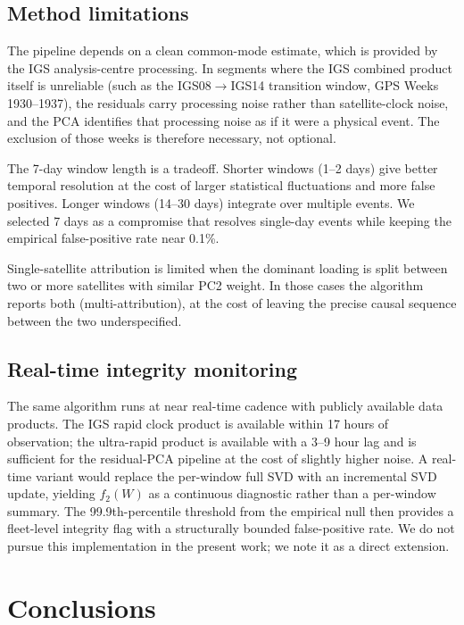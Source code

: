 \documentclass[11pt,a4paper]{article}
\begin{document}
\subsection{Method limitations}

The pipeline depends on a clean common-mode estimate, which is provided by the IGS analysis-centre processing. In segments where the IGS combined product itself is unreliable (such as the IGS08$\to$IGS14 transition window, GPS Weeks 1930--1937), the residuals carry processing noise rather than satellite-clock noise, and the PCA identifies that processing noise as if it were a physical event. The exclusion of those weeks is therefore necessary, not optional.

The 7-day window length is a tradeoff. Shorter windows (1--2 days) give better temporal resolution at the cost of larger statistical fluctuations and more false positives. Longer windows (14--30 days) integrate over multiple events. We selected 7 days as a compromise that resolves single-day events while keeping the empirical false-positive rate near 0.1\%.

Single-satellite attribution is limited when the dominant loading is split between two or more satellites with similar PC2 weight. In those cases the algorithm reports both (multi-attribution), at the cost of leaving the precise causal sequence between the two underspecified.

\subsection{Real-time integrity monitoring}

The same algorithm runs at near real-time cadence with publicly available data products. The IGS rapid clock product is available within 17 hours of observation; the ultra-rapid product is available with a 3--9 hour lag and is sufficient for the residual-PCA pipeline at the cost of slightly higher noise. A real-time variant would replace the per-window full SVD with an incremental SVD update, yielding $f_2(W)$ as a continuous diagnostic rather than a per-window summary. The 99.9th-percentile threshold from the empirical null then provides a fleet-level integrity flag with a structurally bounded false-positive rate. We do not pursue this implementation in the present work; we note it as a direct extension.

\section{Conclusions}
\end{document}

